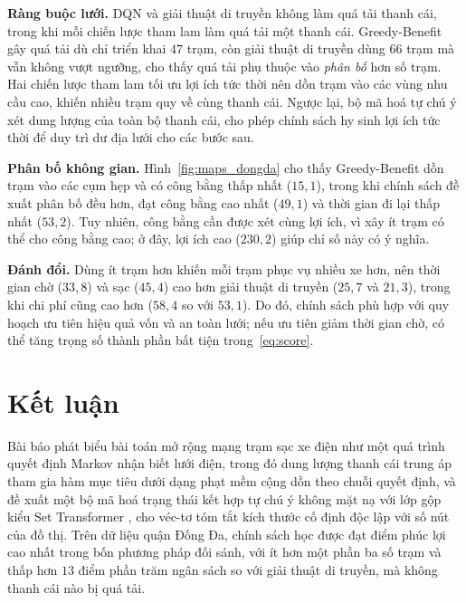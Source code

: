 \documentclass[10pt, conference, a4paper, compsocconf]{IEEEtran}
\begin{document}
\textbf{Ràng buộc lưới.} DQN và giải thuật di truyền không làm quá tải thanh
cái, trong khi mỗi chiến lược tham lam làm quá tải một thanh cái. Greedy-Benefit
gây quá tải dù chỉ triển khai $47$ trạm, còn giải thuật di truyền dùng $66$
trạm mà vẫn không vượt ngưỡng, cho thấy quá tải phụ thuộc vào \emph{phân bố}
hơn số trạm. Hai chiến lược tham lam tối ưu lợi ích tức thời nên dồn trạm vào
các vùng nhu cầu cao, khiến nhiều trạm quy về cùng thanh cái. Ngược lại, bộ mã
hoá tự chú ý xét dung lượng của toàn bộ thanh cái, cho phép chính sách hy sinh
lợi ích tức thời để duy trì dư địa lưới cho các bước sau.

\textbf{Phân bố không gian.} Hình~\ref{fig:maps_dongda} cho thấy Greedy-Benefit
dồn trạm vào các cụm hẹp và có công bằng thấp nhất ($15{,}1$), trong khi chính
sách đề xuất phân bố đều hơn, đạt công bằng cao nhất ($49{,}1$) và thời gian đi
lại thấp nhất ($53{,}2$). Tuy nhiên, công bằng cần được xét cùng lợi ích, vì
xây ít trạm có thể cho công bằng cao; ở đây, lợi ích cao ($230{,}2$) giúp chỉ
số này có ý nghĩa.

\textbf{Đánh đổi.} Dùng ít trạm hơn khiến mỗi trạm phục vụ nhiều xe hơn, nên
thời gian chờ ($33{,}8$) và sạc ($45{,}4$) cao hơn giải thuật di truyền
($25{,}7$ và $21{,}3$), trong khi chi phí cũng cao hơn ($58{,}4$ so với
$53{,}1$). Do đó, chính sách phù hợp với quy hoạch ưu tiên hiệu quả vốn và an
toàn lưới; nếu ưu tiên giảm thời gian chờ, có thể tăng trọng số thành phần bất
tiện trong~\eqref{eq:score}.

\section{Kết luận}
\label{sec:conclusion}

Bài báo phát biểu bài toán mở rộng mạng trạm sạc xe điện như một quá trình
quyết định Markov nhận biết lưới điện, trong đó dung lượng thanh cái trung áp
tham gia hàm mục tiêu dưới dạng phạt mềm cộng dồn theo chuỗi quyết định, và đề
xuất một bộ mã hoá trạng thái kết hợp tự chú ý không mặt nạ với lớp gộp kiểu
Set Transformer \cite{lee2019set}, cho véc-tơ tóm tắt kích thước cố định độc
lập với số nút của đồ thị. Trên dữ liệu quận Đống Đa, chính sách học được đạt
điểm phúc lợi cao nhất trong bốn phương pháp đối sánh, với ít hơn một phần ba
số trạm và thấp hơn $13$ điểm phần trăm ngân sách so với giải thuật di truyền,
mà không thanh cái nào bị quá tải.
\end{document}
